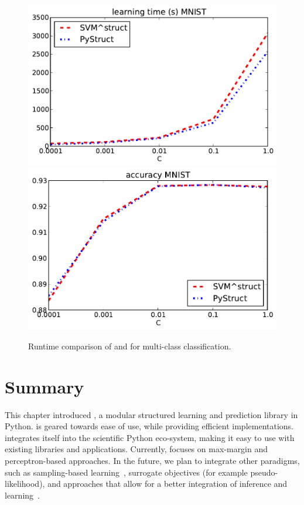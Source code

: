 \begin{figure}
\centering
\includegraphics[width=.45\textwidth]{times_MNIST}
\includegraphics[width=.45\textwidth]{accs_MNIST}
\caption{Runtime comparison of \pystruct and \svmstruct for multi-class
    classification.
}
\label{fig:timings}
\end{figure}


\section{Summary}
This chapter introduced \pystruct, a modular structured learning and prediction library in Python.
\pystruct is geared towards ease of use, while providing efficient implementations.
\pystruct integrates itself into the scientific Python eco-system, making it easy to use with
existing libraries and applications.
Currently, \pystruct focuses on max-margin and perceptron-based approaches. In the future,
we plan to integrate other paradigms, such as sampling-based learning~\citep{wick2011samplerank},
surrogate objectives (for example pseudo-likelihood), and approaches that allow for a better integration
of inference and learning~\citep{meshi2010learning}.
